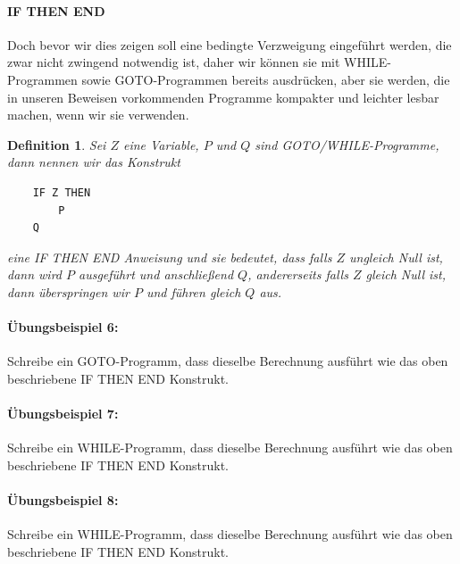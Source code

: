 \documentclass[11pt,a4paper,leqno]{report}
\newtheorem{definition}[theorem]{Definition}
\numberwithin{equation}{chapter}
\begin{document}
\paragraph{IF THEN END} Doch bevor wir dies zeigen soll eine bedingte Verzweigung eingef\"uhrt werden, die zwar nicht zwingend notwendig ist, daher wir k\"onnen sie mit WHILE-Programmen sowie GOTO-Programmen bereits ausdr\"ucken, aber sie werden, die in unseren Beweisen vorkommenden Programme kompakter und leichter lesbar machen, wenn wir sie verwenden.
\begin{definition}
Sei $Z$ eine Variable, $P$ und $Q$ sind GOTO/WHILE-Programme, dann nennen wir das Konstrukt
	\begin{lstlisting}
	IF Z THEN
		P
	Q
	\end{lstlisting}
eine IF THEN END Anweisung und sie bedeutet, dass falls $Z$ ungleich Null ist, dann wird $P$ ausgef\"uhrt und anschlie\ss{}end $Q$, andererseits falls $Z$ gleich Null ist, dann \"uberspringen wir $P$ und f\"uhren gleich $Q$ aus.
\end{definition}

\paragraph{\"Ubungsbeispiel 6:} Schreibe ein GOTO-Programm, dass dieselbe Berechnung ausf\"uhrt wie das oben beschriebene IF THEN END Konstrukt.

\paragraph{\"Ubungsbeispiel 7:} Schreibe ein WHILE-Programm, dass dieselbe Berechnung ausf\"uhrt wie das oben beschriebene IF THEN END Konstrukt.

\paragraph{\"Ubungsbeispiel 8:} Schreibe ein WHILE-Programm, dass dieselbe Berechnung ausf\"uhrt wie das oben beschriebene IF THEN END Konstrukt.
\end{document}
